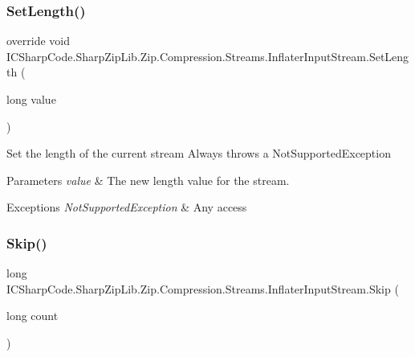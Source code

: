 \subsubsection{\texorpdfstring{Set\+Length()}{SetLength()}\hspace{0.1cm}{\footnotesize\ttfamily [2/2]}}
{\footnotesize\ttfamily override void I\+C\+Sharp\+Code.\+Sharp\+Zip\+Lib.\+Zip.\+Compression.\+Streams.\+Inflater\+Input\+Stream.\+Set\+Length (\begin{DoxyParamCaption}\item[{long}]{value }\end{DoxyParamCaption})\hspace{0.3cm}{\ttfamily [inline]}}



Set the length of the current stream Always throws a Not\+Supported\+Exception 


\begin{DoxyParams}{Parameters}
{\em value} & The new length value for the stream.\\
\hline
\end{DoxyParams}

\begin{DoxyExceptions}{Exceptions}
{\em Not\+Supported\+Exception} & Any access\\
\hline
\end{DoxyExceptions}
\mbox{\label{class_i_c_sharp_code_1_1_sharp_zip_lib_1_1_zip_1_1_compression_1_1_streams_1_1_inflater_input_stream_ac10ceeea77e8db40068875b66ca86f42}} 
\subsubsection{\texorpdfstring{Skip()}{Skip()}\hspace{0.1cm}{\footnotesize\ttfamily [1/2]}}
{\footnotesize\ttfamily long I\+C\+Sharp\+Code.\+Sharp\+Zip\+Lib.\+Zip.\+Compression.\+Streams.\+Inflater\+Input\+Stream.\+Skip (\begin{DoxyParamCaption}\item[{long}]{count }\end{DoxyParamCaption})\hspace{0.3cm}{\ttfamily [inline]}}



